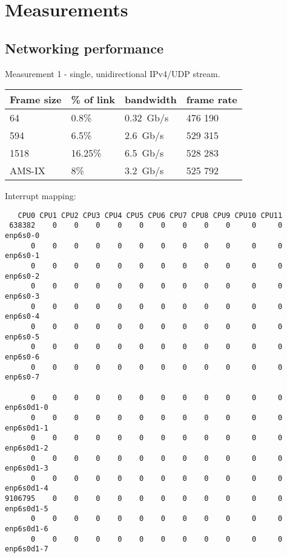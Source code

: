 
\chapter{Measurements}

\section{Networking performance}
Measurement 1 - single, unidirectional IPv4/UDP stream.
\begin{tabular}{ | l | l | l | l | }
\hline
Frame size & \% of link & bandwidth & frame rate \\
\hline
64     & 0.8\%   & 0.32~Gb/s & 476 190 \\ %
594    & 6.5\%   & 2.6~Gb/s  & 529 315 \\ %
1518   & 16.25\% & 6.5~Gb/s  & 528 283 \\ %
AMS-IX & 8\%     & 3.2~Gb/s  & 525 792 \\ %
\hline
\end{tabular}

Interrupt mapping:
\begin{lstlisting}
   CPU0 CPU1 CPU2 CPU3 CPU4 CPU5 CPU6 CPU7 CPU8 CPU9 CPU10 CPU11
 638382    0    0    0    0    0    0    0    0    0     0     0  enp6s0-0
      0    0    0    0    0    0    0    0    0    0     0     0  enp6s0-1
      0    0    0    0    0    0    0    0    0    0     0     0  enp6s0-2
      0    0    0    0    0    0    0    0    0    0     0     0  enp6s0-3
      0    0    0    0    0    0    0    0    0    0     0     0  enp6s0-4
      0    0    0    0    0    0    0    0    0    0     0     0  enp6s0-5
      0    0    0    0    0    0    0    0    0    0     0     0  enp6s0-6
      0    0    0    0    0    0    0    0    0    0     0     0  enp6s0-7

      0    0    0    0    0    0    0    0    0    0     0     0  enp6s0d1-0
      0    0    0    0    0    0    0    0    0    0     0     0  enp6s0d1-1
      0    0    0    0    0    0    0    0    0    0     0     0  enp6s0d1-2
      0    0    0    0    0    0    0    0    0    0     0     0  enp6s0d1-3
      0    0    0    0    0    0    0    0    0    0     0     0  enp6s0d1-4
9106795    0    0    0    0    0    0    0    0    0     0     0  enp6s0d1-5
      0    0    0    0    0    0    0    0    0    0     0     0  enp6s0d1-6
      0    0    0    0    0    0    0    0    0    0     0     0  enp6s0d1-7
\end{lstlisting}

